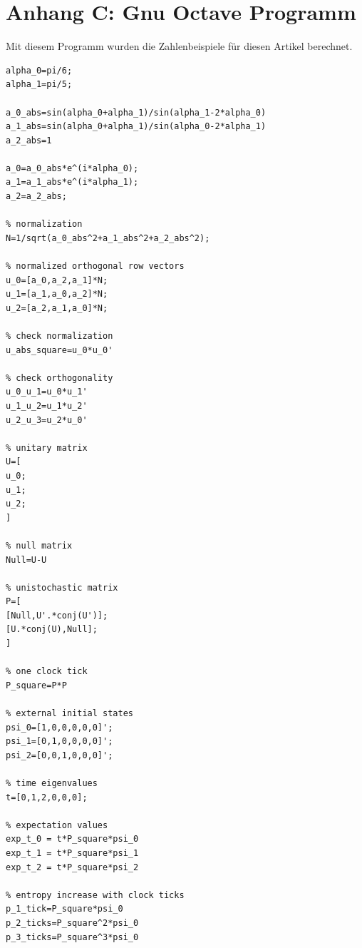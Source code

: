 \documentclass[12pt]{article}
\begin{document}
\section{Anhang C: Gnu Octave Programm}
Mit diesem Programm wurden die Zahlenbeispiele für diesen Artikel berechnet.
\begin{verbatim}
alpha_0=pi/6;
alpha_1=pi/5;

a_0_abs=sin(alpha_0+alpha_1)/sin(alpha_1-2*alpha_0)
a_1_abs=sin(alpha_0+alpha_1)/sin(alpha_0-2*alpha_1)
a_2_abs=1

a_0=a_0_abs*e^(i*alpha_0);
a_1=a_1_abs*e^(i*alpha_1);
a_2=a_2_abs;

% normalization
N=1/sqrt(a_0_abs^2+a_1_abs^2+a_2_abs^2);

% normalized orthogonal row vectors
u_0=[a_0,a_2,a_1]*N;
u_1=[a_1,a_0,a_2]*N;
u_2=[a_2,a_1,a_0]*N;

% check normalization
u_abs_square=u_0*u_0'

% check orthogonality
u_0_u_1=u_0*u_1'
u_1_u_2=u_1*u_2'
u_2_u_3=u_2*u_0'

% unitary matrix
U=[
u_0;
u_1;
u_2;
]

% null matrix
Null=U-U

% unistochastic matrix
P=[
[Null,U'.*conj(U')];
[U.*conj(U),Null];
]

% one clock tick
P_square=P*P

% external initial states
psi_0=[1,0,0,0,0,0]';
psi_1=[0,1,0,0,0,0]';
psi_2=[0,0,1,0,0,0]';

% time eigenvalues
t=[0,1,2,0,0,0];

% expectation values
exp_t_0 = t*P_square*psi_0
exp_t_1 = t*P_square*psi_1
exp_t_2 = t*P_square*psi_2

% entropy increase with clock ticks
p_1_tick=P_square*psi_0
p_2_ticks=P_square^2*psi_0
p_3_ticks=P_square^3*psi_0
\end{verbatim}
\end{document}
